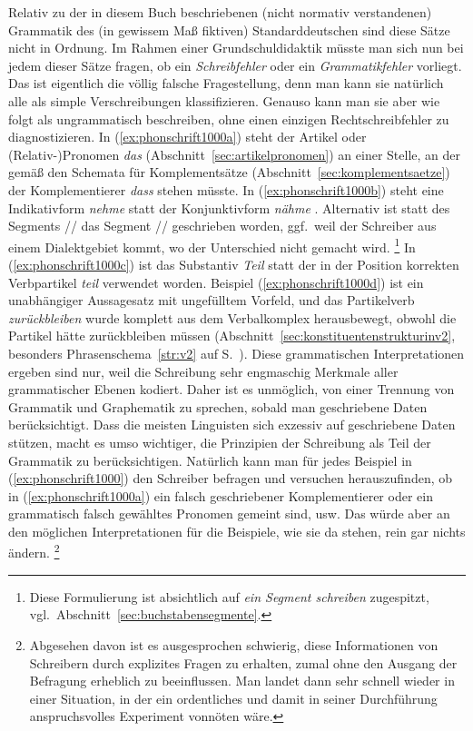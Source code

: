 Relativ zu der in diesem Buch beschriebenen (nicht normativ verstandenen) Grammatik des (in gewissem Maß fiktiven) Standarddeutschen sind diese Sätze nicht in Ordnung.
Im Rahmen einer Grundschuldidaktik müsste man sich nun bei jedem dieser Sätze fragen, ob ein \textit{Schreibfehler} oder ein \textit{Grammatikfehler} vorliegt.
Das ist eigentlich die völlig falsche Fragestellung, denn man kann sie natürlich alle als simple Verschreibungen klassifizieren.
Genauso kann man sie aber wie folgt als ungrammatisch beschreiben, ohne einen einzigen Rechtschreibfehler zu diagnostizieren.
In (\ref{ex:phonschrift1000a}) steht der Artikel oder (Relativ-)Pronomen \textit{das} (Abschnitt~\ref{sec:artikelpronomen}) an einer Stelle, an der gemäß den Schemata für Komplementsätze (Abschnitt~\ref{sec:komplementsaetze}) der Komplementierer \textit{dass} stehen müsste.
In (\ref{ex:phonschrift1000b}) steht eine Indikativform \textit{nehme} \textipa{[ne:me]} statt der Konjunktivform \textit{nähme} \textipa{[nE:me]}.
Alternativ ist statt des Segments // das Segment // geschrieben worden, ggf.\ weil der Schreiber aus einem Dialektgebiet kommt, wo der Unterschied nicht gemacht wird.%
\footnote{Diese Formulierung ist absichtlich auf \textit{ein Segment schreiben} zugespitzt, vgl.\ Abschnitt~\ref{sec:buchstabensegmente}.}
In (\ref{ex:phonschrift1000c}) ist das Substantiv \textit{Teil} statt der in der Position korrekten Verbpartikel \textit{teil} verwendet worden.
Beispiel (\ref{ex:phonschrift1000d}) ist ein unabhängiger Aussagesatz mit ungefülltem Vorfeld, und das Partikelverb \textit{zurückbleiben} wurde komplett aus dem Verbalkomplex herausbewegt, obwohl die Partikel hätte zurückbleiben müssen (Abschnitt~\ref{sec:konstituentenstrukturinv2}, besonders Phrasenschema~\ref{str:v2} auf S.~\pageref{str:v2}).
Diese grammatischen Interpretationen ergeben sind nur, weil die Schreibung sehr engmaschig Merkmale aller grammatischer Ebenen kodiert.
Daher ist es unmöglich, von einer Trennung von Grammatik und Graphematik zu sprechen, sobald man geschriebene Daten berücksichtigt.
Dass die meisten Linguisten sich exzessiv auf geschriebene Daten stützen, macht es umso wichtiger, die Prinzipien der Schreibung als Teil der Grammatik zu berücksichtigen.
Natürlich kann man für jedes Beispiel in (\ref{ex:phonschrift1000}) den Schreiber befragen und versuchen herauszufinden, ob in (\ref{ex:phonschrift1000a}) ein falsch geschriebener Komplementierer oder ein grammatisch falsch gewähltes Pronomen gemeint sind, usw.
Das würde aber an den möglichen Interpretationen für die Beispiele, wie sie da stehen, rein gar nichts ändern.%
\footnote{Abgesehen davon ist es ausgesprochen schwierig, diese Informationen von Schreibern durch explizites Fragen zu erhalten, zumal ohne den Ausgang der Befragung erheblich zu beeinflussen.
Man landet dann sehr schnell wieder in einer Situation, in der ein ordentliches und damit in seiner Durchführung anspruchsvolles Experiment vonnöten wäre.}

